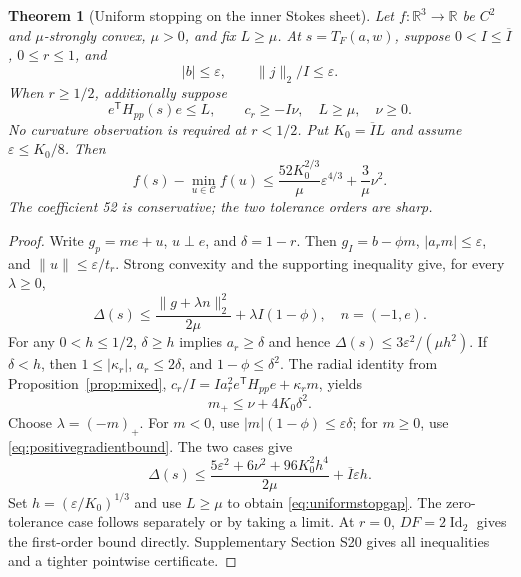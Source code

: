 \documentclass[10pt,a4paper]{article}
\newtheorem{theorem}{Theorem}
\begin{document}
\begin{theorem}[Uniform stopping on the inner Stokes sheet]
\label{thm:uniformstopping}
Let $f:\mathbb R^3\to\mathbb R$ be $C^2$ and $\mu$-strongly convex, $\mu>0$, and fix $L\ge\mu$. At $s=T_F(a,w)$, suppose $0<I\le\overline I$, $0\le r\le1$, and
\begin{equation}
 |b|\le\varepsilon,\qquad \|j\|_2/I\le\varepsilon.
 \label{eq:normalizedstop}
\end{equation}
When $r\ge1/2$, additionally suppose
\begin{equation}
 e^{\mathsf T}H_{pp}(s)e\le L,\qquad c_r\ge-I\nu,
 \quad L\ge\mu,\quad \nu\ge0.
 \label{eq:radialstop}
\end{equation}
No curvature observation is required at $r<1/2$. Put $K_0=\overline I L$ and assume $\varepsilon\le K_0/8$. Then
\begin{equation}
 \boxed{\ f(s)-\min_{u\in\mathcal C}f(u)
 \le \frac{52K_0^{2/3}}{\mu}\varepsilon^{4/3}
       +\frac{3}{\mu}\nu^2.\ }
 \label{eq:uniformstopgap}
\end{equation}
The coefficient 52 is conservative; the two tolerance orders are sharp.
\end{theorem}
\begin{proof}
Write $g_p=me+u$, $u\perp e$, and $\delta=1-r$. Then $g_I=b-\phi m$, $|a_rm|\le\varepsilon$, and $\|u\|\le\varepsilon/t_r$. Strong convexity and the supporting inequality give, for every $\lambda\ge0$,
\begin{equation}
 \Delta(s)\le\frac{\|g+\lambda n\|_2^2}{2\mu}
                  +\lambda I(1-\phi),\quad n=(-1,e).
 \label{eq:strongstopdual}
\end{equation}
For any $0<h\le1/2$, $\delta\ge h$ implies $a_r\ge\delta$ and hence $\Delta(s)\le3\varepsilon^2/(\mu h^2)$. If $\delta<h$, then $1\le|\kappa_r|$, $a_r\le2\delta$, and $1-\phi\le\delta^2$. The radial identity from Proposition~\ref{prop:mixed}, $c_r/I=Ia_r^2 e^{\mathsf T}H_{pp}e+\kappa_r m$, yields
\begin{equation}
 m_+\le\nu+4K_0\delta^2.
 \label{eq:positivegradientbound}
\end{equation}
Choose $\lambda=(-m)_+$. For $m<0$, use $|m|(1-\phi)\le\varepsilon\delta$; for $m\ge0$, use \eqref{eq:positivegradientbound}. The two cases give
\begin{equation}
 \Delta(s)\le\frac{5\varepsilon^2+6\nu^2+96K_0^2h^4}{2\mu}
                  +\overline I\varepsilon h.
 \label{eq:bandstopgap}
\end{equation}
Set $h=(\varepsilon/K_0)^{1/3}$ and use $L\ge\mu$ to obtain \eqref{eq:uniformstopgap}. The zero-tolerance case follows separately or by taking a limit. At $r=0$, $DF=2\operatorname{Id}_2$ gives the first-order bound directly. Supplementary Section S20 gives all inequalities and a tighter pointwise certificate.
\end{proof}
\end{document}
